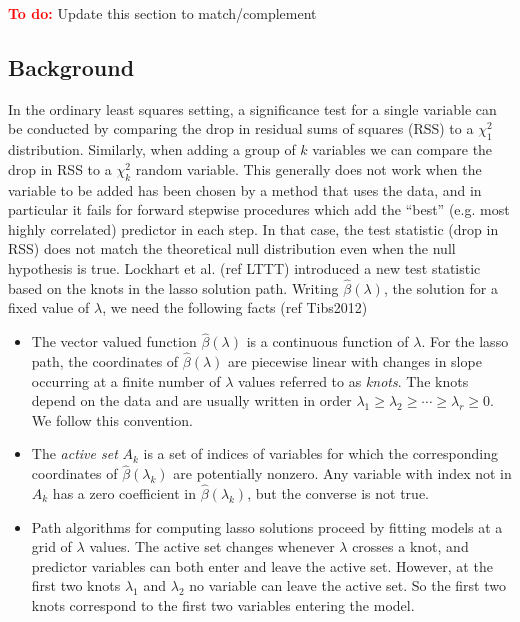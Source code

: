 \documentclass{imsart}
\newcommand{\todo}{\textcolor{red}{\textbf{To do: }}}
\begin{document}
\todo Update this section to match/complement \citep{tests:adaptive}

\subsection{Background}
In the ordinary least squares setting, a significance test for a
single variable can be conducted by comparing the drop in residual
sums of squares (RSS) to a $\chi^2_1$ distribution. Similarly, when
adding a group of $k$ variables we can compare the drop in RSS to a
$\chi^2_k$ random variable. This generally does not work when the
variable to be added has been chosen by a method that uses the data,
and in particular it fails for forward stepwise procedures which add
the ``best'' (e.g. most highly correlated) predictor in each step. In
that case, the test statistic (drop in RSS) does not match the
theoretical null distribution even when the null hypothesis is
true. Lockhart et al. (ref LTTT) introduced a new test statistic based
on the knots in the lasso solution path. Writing $\hat
\beta(\lambda)$, the solution for a fixed value of $\lambda$, we need
the following facts (ref Tibs2012) 

\begin{itemize}

  \item The vector valued function $\hat \beta(\lambda)$ is a
    continuous function of $\lambda$. For the lasso path, the
    coordinates of $\hat \beta(\lambda)$ are piecewise linear with
    changes in slope occurring at a finite number of $\lambda$ values
    referred to as \emph{knots}. The knots depend on the data and are
    usually written in order $\lambda_1 \geq \lambda_2 \geq \cdots
    \geq \lambda_r \geq 0$. We follow this convention. 

  \item The \emph{active set} $A_k$ is a set of indices of variables
    for which the corresponding coordinates of $\hat \beta(\lambda_k)$
    are potentially nonzero. Any variable with index not in $A_k$ has
    a zero coefficient in $\hat \beta(\lambda_k)$, but the converse is
    not true. 
  
  \item Path algorithms for computing lasso solutions proceed by
    fitting models at a grid of $\lambda$ values. The active set
    changes whenever $\lambda$ crosses a knot, and predictor variables
    can both enter and leave the active set. However, at the first two
    knots $\lambda_1$ and $\lambda_2$ no variable can leave the active
    set. So the first two knots correspond to the first two variables
    entering the model. 

\end{itemize}
\end{document}
